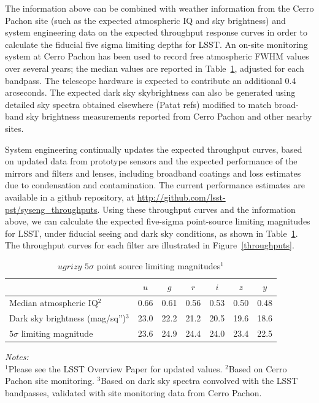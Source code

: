 \documentclass{iau}
\begin{document}
The information above can be combined with weather information from
the Cerro Pachon site (such as the expected atmospheric IQ and sky
brightness) and system engineering data on the expected throughput
response curves in order to calculate the fiducial five sigma limiting
depths for LSST. An on-site monitoring system at Cerro Pachon has been
used to record free atmospheric FWHM values over several years; the
median values are reported in Table~\ref{table2}, adjusted for each
bandpass. The telescope hardware is expected to contribute an
additional 0.4 arcseconds. The expected dark sky skybrightness can
also be generated using detailed sky spectra obtained elsewhere (Patat
refs) modified to match broad-band sky brightness measurements
reported from Cerro Pachon and other nearby sites.

System engineering continually updates the expected throughput curves,
based on updated data from prototype sensors and the expected
performance of the mirrors and filters and lenses, including broadband
coatings and loss estimates due to condensation and contamination. The
current performance estimates are available in a github repository, at
\url{http://github.com/lsst-pst/syseng_throughputs}.  Using these
throughput curves and the information above, we can calculate the
expected five-sigma point-source limiting magnitudes for LSST, under
fiducial seeing and dark sky conditions, as shown in
Table~\ref{table2}. The throughput curves for each filter are
illustrated in Figure~\ref{throughputs}.

\begin{table}
\begin{center}
\caption{$ugrizy$ $5\sigma$ point source limiting magnitudes$^1$}
\label{table2}
 {\scriptsize
  \begin{tabular}{|l|c|c|c|c|c|c|}\hline
 & $u$ & $g$ & $r$ & $i$ & $z$ & $y$ \\ \hline
Median atmospheric IQ$^2$  & 0.66 & 0.61 & 0.56 & 0.53 & 0.50 & 0.48 \\
    \hline
Dark sky brightness (mag/sq'')$^3$ & 23.0 & 22.2 &  21.2 & 20.5 & 19.6 & 18.6
    \\ \hline
$5\sigma$ limiting magnitude & 23.6 & 24.9 & 24.4 & 24.0 & 23.4 & 22.5
    \\ \hline
 \end{tabular}
  }
 \end{center}
\vspace{1mm}
 \scriptsize{
 {\it Notes:}\\
  $^1$Please see the LSST Overview Paper \cite{overviewpaper} for
  updated values.
  $^2$Based on Cerro Pachon site monitoring.
  $^3$Based on dark sky spectra convolved with the LSST bandpasses,
  validated with site monitoring data from Cerro Pachon.}
\end{table}
\end{document}

